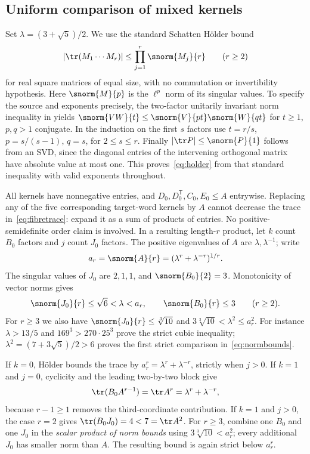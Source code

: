 \subsection{Uniform comparison of mixed kernels}
Set $\lambda=(3+\sqrt5)/2$. We use the standard Schatten Hölder bound
\begin{equation}\label{eq:holder}
 |\tr(M_1\cdots M_r)|\le\prod_{j=1}^r\snorm{M_j}{r}
 \qquad(r\ge2)
\end{equation}
for real square matrices of equal size, with no commutation or
invertibility hypothesis. Here $\snorm{M}{p}$ is the $\ell^p$ norm
of its singular values. To specify the source and exponents precisely,
the two-factor unitarily invariant norm inequality in
\citet[Example 6.18 and Theorem 6.32]{tropp2022matrix} yields
$\snorm{VW}{t}\le\snorm{V}{pt}\snorm{W}{qt}$ for $t\ge1$,
$p,q>1$ conjugate. In the induction on the first $s$ factors use
$t=r/s$, $p=s/(s-1)$, $q=s$, for $2\le s\le r$.
Finally $|\tr P|\le\snorm{P}{1}$ follows from an SVD, since the
diagonal entries of the intervening orthogonal matrix have absolute
value at most one. This proves~\eqref{eq:holder} from that standard
inequality with valid exponents throughout.

All kernels have nonnegative entries, and
$D_0,D_0^{\mathsf T},C_0,E_0\le A$ entrywise. Replacing any of the
five corresponding target-word kernels by $A$ cannot decrease the trace
in~\eqref{eq:fibretrace}: expand it as a sum of products of entries.
No positive-semidefinite order claim is involved. In a resulting length-$r$
product, let $k$ count $B_0$ factors and $j$ count $J_0$ factors.
The positive eigenvalues of $A$ are $\lambda,\lambda^{-1}$; write
\[
 a_r=\snorm{A}{r}=(\lambda^r+\lambda^{-r})^{1/r}.
\]
The singular values of $J_0$ are $2,1,1$, and
$\snorm{B_0}{2}=3$. Monotonicity of vector norms gives
\begin{equation}\label{eq:normbounds}
 \snorm{J_0}{r}\le\sqrt6<\lambda<a_r,\qquad
 \snorm{B_0}{r}\le3\qquad(r\ge2).
\end{equation}
For $r\ge3$ we also have $\snorm{J_0}{r}\le\sqrt[3]{10}$ and
$3\sqrt[3]{10}<\lambda^2\le a_r^2$. For instance
$\lambda>13/5$ and $169^3>270\cdot25^3$ prove the strict cubic
inequality; $\lambda^2=(7+3\sqrt5)/2>6$ proves the first strict
comparison in~\eqref{eq:normbounds}.

If $k=0$, Hölder bounds the trace by
$a_r^r=\lambda^r+\lambda^{-r}$, strictly when $j>0$.
If $k=1$ and $j=0$, cyclicity and the leading two-by-two block give
\begin{equation}\label{eq:oneb}
 \tr(B_0A^{r-1})=\tr A^r=\lambda^r+\lambda^{-r},
\end{equation}
because $r-1\ge1$ removes the third-coordinate contribution. If
$k=1$ and $j>0$, the case $r=2$ gives
$\tr(B_0J_0)=4<7=\tr A^2$. For $r\ge3$, combine one $B_0$ and
one $J_0$ in the \emph{scalar product of norm bounds} using
$3\sqrt[3]{10}<a_r^2$; every additional $J_0$ has smaller norm than
$A$. The resulting bound is again strict below $a_r^r$.

